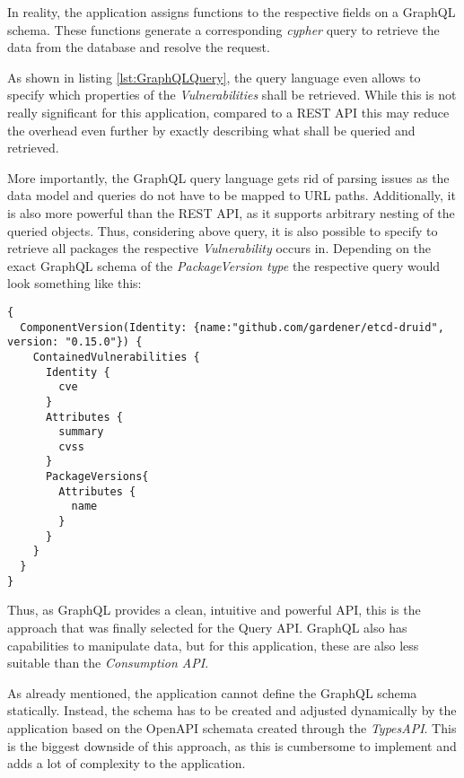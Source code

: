 In reality, the application assigns functions to the respective fields on a GraphQL schema. These functions generate a corresponding \emph{cypher} query to retrieve the data from the database and resolve the request.\par
As shown in listing \ref{lst:GraphQLQuery}, the query language even allows to specify which properties of the \emph{Vulnerabilities} shall be retrieved. While this is not really significant for this application, compared to a REST API this may reduce the overhead even further by exactly describing what shall be queried and retrieved.\par 
More importantly, the GraphQL query language gets rid of parsing issues as the data model and queries do not have to be mapped to URL paths. Additionally, it is also more powerful than the REST API, as it supports arbitrary nesting of the queried objects. Thus, considering above query, it is also possible to specify to retrieve all packages the respective \emph{Vulnerability} occurs in. Depending on the exact GraphQL schema of the \emph{PackageVersion} \emph{type} the respective query would look something like this:

\begin{lstlisting}[basicstyle=\tiny, caption=Nested GraphQL Query, captionpos=b, label=lst:NestedGraphQLQuery]
{
  ComponentVersion(Identity: {name:"github.com/gardener/etcd-druid", version: "0.15.0"}) {
    ContainedVulnerabilities {
      Identity {
        cve
      }
      Attributes {
        summary
        cvss 
      }
      PackageVersions{
        Attributes {
          name
        }
      }
    }
  }
}
\end{lstlisting}

Thus, as GraphQL provides a clean, intuitive and powerful API, this is the approach that was finally selected for the Query API. GraphQL also has capabilities to manipulate data, but for this application, these are also less suitable than the \emph{Consumption API}.\par
As already mentioned, the application cannot define the GraphQL schema statically. Instead, the schema has to be created and adjusted dynamically by the application based on the OpenAPI schemata created through the \emph{TypesAPI}. This is the biggest downside of this approach, as this is cumbersome to implement and adds a lot of complexity to the application.

